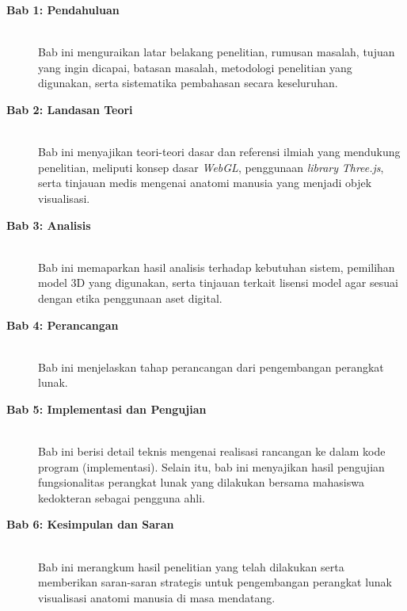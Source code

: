 \begin{description}
    \item[\textbf{Bab 1: Pendahuluan}] \hfill \\
    Bab ini menguraikan latar belakang penelitian, rumusan masalah, tujuan yang ingin dicapai, batasan masalah, metodologi penelitian yang digunakan, serta sistematika pembahasan secara keseluruhan.

    \item[\textbf{Bab 2: Landasan Teori}] \hfill \\
    Bab ini menyajikan teori-teori dasar dan referensi ilmiah yang mendukung penelitian, meliputi konsep dasar \textit{WebGL}, penggunaan \textit{library} \textit{Three.js}, serta tinjauan medis mengenai anatomi manusia yang menjadi objek visualisasi.

    \item[\textbf{Bab 3: Analisis}] \hfill \\
    Bab ini memaparkan hasil analisis terhadap kebutuhan sistem, pemilihan model 3D yang digunakan, serta tinjauan terkait lisensi model agar sesuai dengan etika penggunaan aset digital.

    \item[\textbf{Bab 4: Perancangan}] \hfill \\
    Bab ini menjelaskan tahap perancangan dari pengembangan perangkat lunak.

    \item[\textbf{Bab 5: Implementasi dan Pengujian}] \hfill \\
    Bab ini berisi detail teknis mengenai realisasi rancangan ke dalam kode program (implementasi). Selain itu, bab ini menyajikan hasil pengujian fungsionalitas perangkat lunak yang dilakukan bersama mahasiswa kedokteran sebagai pengguna ahli.

    \item[\textbf{Bab 6: Kesimpulan dan Saran}] \hfill \\
    Bab ini merangkum hasil penelitian yang telah dilakukan serta memberikan saran-saran strategis untuk pengembangan perangkat lunak visualisasi anatomi manusia di masa mendatang.
\end{description}

